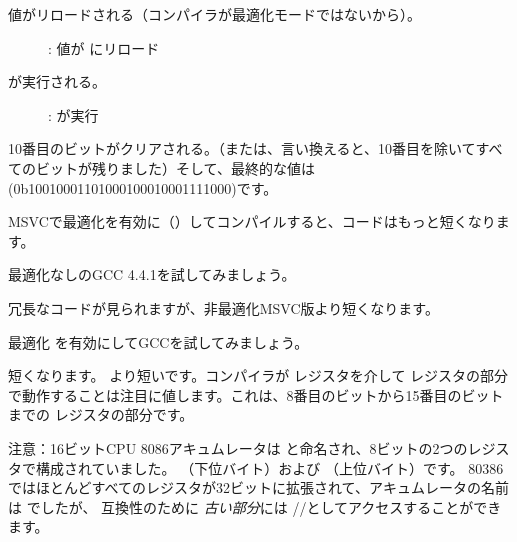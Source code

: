 \clearpage
値がリロードされる（コンパイラが最適化モードではないから）。

\begin{figure}[H]
\centering
{}
\caption{\olly: 値が \EDX にリロード}
\label{fig:set_reset_olly3}
\end{figure}

\clearpage
\AND が実行される。

\begin{figure}[H]
\centering
{}
\caption{\olly: \AND が実行}
\label{fig:set_reset_olly4}
\end{figure}

10番目のビットがクリアされる。（または、言い換えると、10番目を除いてすべてのビットが残りました）そして、最終的な値は
 (0b1001000110100010001{\color{red}0}001111000)です。


MSVCで最適化を有効に（\Ox）してコンパイルすると、コードはもっと短くなります。




最適化なしのGCC 4.4.1を試してみましょう。



冗長なコードが見られますが、非最適化MSVC版より短くなります。

最適化 \Othree を有効にしてGCCを試してみましょう。




短くなります。
より短いです。コンパイラが \AH レジスタを介して \EAX レジスタの部分で動作することは注目に値します。これは、8番目のビットから15番目のビットまでの \EAX レジスタの部分です。


注意：16ビットCPU 8086アキュムレータは \AX と命名され、8ビットの2つのレジスタで構成されていました。
\AL （下位バイト）および \AH （上位バイト）です。
80386ではほとんどすべてのレジスタが32ビットに拡張されて、アキュムレータの名前は \EAX でしたが、
互換性のために
\emph{古い部分}には \AX/\AH/\AL としてアクセスすることができます。

